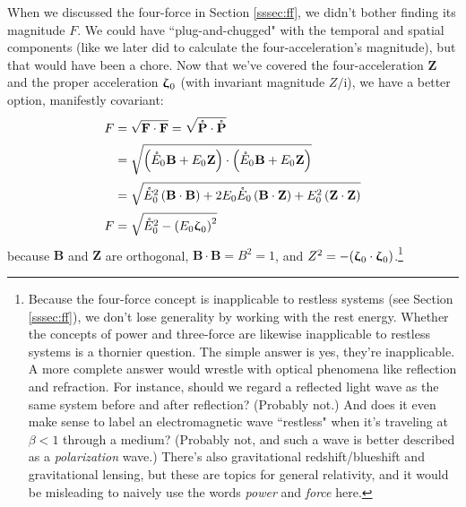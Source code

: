 \documentclass[12pt]{article}
\renewcommand{\vv}[1]{\mathbf{#1}}
\newcommand{\vvzeta}{\bm{\upzeta}}
\begin{document}
When we discussed the four-force in Section \ref{sssec:ff}, we didn't bother finding its magnitude $F$. We could have ``plug-and-chugged" with the temporal and spatial components (like we later did to calculate the four-acceleration's magnitude), but that would have been a chore. Now that we've covered the four-acceleration $\vv Z$ and the proper acceleration $\vvzeta_{\mkern1mu 0}$ (with invariant magnitude $Z/\mathrm{i}$), we have a better option, manifestly covariant:
\begin{equation}\label{eq:40}
\begin{split}
F &= \sqrt{\vv F \cdot \vv F} = \sqrt{\mathring{\vv P} \cdot \mathring{\vv P}} \\[2pt]
&= \sqrt{ \left( \mathring{E}_0 \mkern.5mu \vv B + E_0 \mkern.5mu \vv Z \right) \cdot \left( \mathring{E}_0 \mkern.5mu \vv B + E_0 \mkern.5mu \vv Z \right) }\\[2pt]
&= \sqrt{ \mathring{E}_0^2 \left( \vv B \cdot \vv B \right) + 2 E_0 \mathring{E}_0 \left( \vv B \cdot \vv Z \right) + E_0^2 \left( \vv Z \cdot \vv Z \right) } \\[2pt]
F &= \sqrt{ \mathring{E}_0^2 - \left( E_0 \vvzeta_{\mkern1mu 0} \right)^2 }
\end{split}
\end{equation}
because $\vv B$ and $\vv Z$ are orthogonal, $\vv B \cdot \vv B = B^2 = 1$, and $Z^2 = - (\vvzeta_{\mkern1mu 0} \cdot \vvzeta_{\mkern1mu 0})$.\footnote{Because the four-force concept is inapplicable to restless systems (see Section \ref{sssec:ff}), we don't lose generality by working with the rest energy. Whether the concepts of power and three-force are likewise inapplicable to restless systems is a thornier question. The simple answer is yes, they're inapplicable. A more complete answer would wrestle with optical phenomena like reflection and refraction. For instance, should we regard a reflected light wave as the same system before and after reflection? (Probably not.) And does it even make sense to label an electromagnetic wave ``restless" when it's traveling at $\beta < 1$ through a medium? (Probably not, and such a wave is better described as a \emph{polarization} wave.) There's also gravitational redshift/blueshift and gravitational lensing, but these are topics for general relativity, and it would be misleading to naively use the words \emph{power} and \emph{force} here.}
\end{document}
